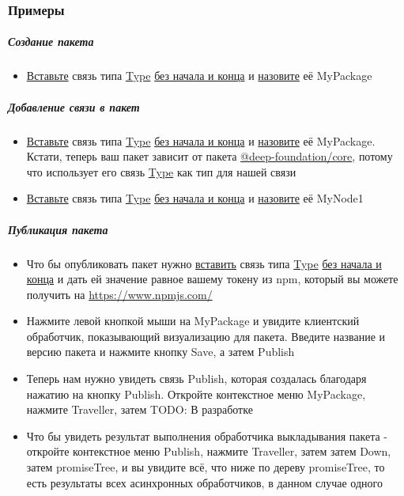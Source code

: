 \documentclass{article}
\begin{document}
\subsubsection{Примеры}
\subparagraph{Создание пакета}
\begin{itemize}
  \item \hyperlink{DeepCase.InsertLink.Description}{Вставьте} связь типа
        \hyperlink{Core.Package.Description}{Type}
        \hyperlink{FAQ.HowToInsertLinkWithoutFromAndTo}{без начала и конца} и
        \hyperlink{FAQ.HowToSetName}{назовите} её MyPackage
\end{itemize}
\subparagraph{Добавление связи в пакет}
\begin{itemize}
  \item \hyperlink{DeepCase.InsertLink.Description}{Вставьте} связь типа
        \hyperlink{Core.Package.Description}{Type}
        \hyperlink{FAQ.HowToInsertLinkWithoutFromAndTo}{без начала и конца} и
        \hyperlink{FAQ.HowToSetName}{назовите} её MyPackage. Кстати, теперь ваш пакет
        зависит от пакета \hyperlink{Core.Description}{@deep-foundation/core}, потому что
        использует его связь \hyperlink{Core.Type.Description}{Type} как тип для нашей связи
  \item \hyperlink{DeepCase.InsertLink.Description}{Вставьте} связь типа
        \hyperlink{Core.Type.Description}{Type} \hyperlink{FAQ.HowToInsertLinkWithoutFromAndTo}{без
          начала и конца} и \hyperlink{FAQ.HowToSetName}{назовите} её MyNode1
\end{itemize}
\subparagraph{Публикация пакета}
\begin{itemize}
  \item Что бы опубликовать пакет нужно
        \hyperlink{DeepCase.InsertLink.Description}{вставить} связь типа
        \hyperlink{NpmPackager.Token.Description}{Type}
        \hyperlink{FAQ.HowToInsertLinkWithoutFromAndTo}{без начала и конца} и дать ей
        значение равное вашему токену из npm, который вы можете получить на
        \url{https://www.npmjs.com/}
  \item Нажмите левой кнопкой мыши на MyPackage и увидите клиентский
        обработчик, показывающий визуализацию для пакета. Введите название и версию
        пакета и нажмите кнопку Save, а затем Publish
  \item Теперь нам нужно увидеть связь Publish, которая создалась благодаря
        нажатию на кнопку Publish. Откройте контекстное меню MyPackage, нажмите
        Traveller, затем TODO: В разработке %
  \item Что бы увидеть результат выполнения обработчика выкладывания пакета -
        откройте контекстное меню Publish, нажмите Traveller, затем затем Down, затем
        promiseTree, и вы увидите всё, что ниже по дереву promiseTree, то есть
        результаты всех асинхронных обработчиков, в данном случае одного
\end{itemize}
\end{document}

